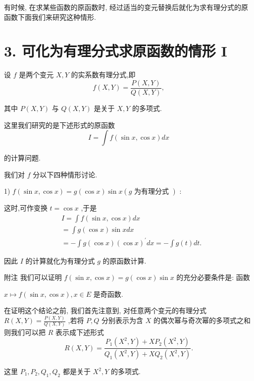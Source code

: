 有时候, 在求某些函数的原函数时, 经过适当的变元替换后就化为求有理分式的原函数下面我们来研究这种情形.

\section*{3. 可化为有理分式求原函数的情形 I}

设 $f$ 是两个变元 $X,Y$ 的实系数有理分式,即
$$f\left( {X,Y}\right)  = \frac{P\left( {X,Y}\right) }{Q\left( {X,Y}\right) },$$

其中 $P\left( {X,Y}\right)$ 与 $Q\left( {X,Y}\right)$ 是关于 $X,Y$ 的多项式.

这里我们研究的是下述形式的原函数
$$I = \int f\left( {\sin x,\cos x}\right) {dx}$$

的计算问题.

我们对 $f$ 分以下四种情形讨论.

1) $f\left( {\sin x,\cos x}\right)  = g\left( {\cos x}\right) \sin x\left( {g\text{ 为有理分式 }}\right)$ :

这时,可作变换 $t = \cos x$ ,于是
\begin{align*}
	&I = \int f\left( {\sin x,\cos x}\right) {dx}\\
	&= \int g\left( {\cos x}\right) \sin {xdx}\\
	&=  - \int g\left( {\cos x}\right) {\left( \cos x\right) }^{\prime }{dx} =  - \int g\left( t\right) {dt}.
\end{align*}

因此 $I$ 的计算就化为有理分式 $g$ 的原函数计算.

附注 我们可以证明 $f\left( {\sin x,\cos x}\right)  = g\left( {\cos x}\right) \sin x$ 的充分必要条件是: 函数

$x \mapsto  f\left( {\sin x,\cos x}\right) ,x \in  E$ 是奇函数.

在证明这个结论之前, 我们首先注意到, 对任意两个变元的有理分式 $R\left( {X,Y}\right)  = \frac{P\left( {X,Y}\right) }{Q\left( {X,Y}\right) }$ ,若将 $P,Q$ 分别表示为含 $X$ 的偶次幂与奇次幂的多项式之和则我们可以把 $R$ 表示成下述形式
$$R\left( {X,Y}\right)  = \frac{{P}_{1}\left( {{X}^{2},Y}\right)  + X{P}_{2}\left( {{X}^{2},Y}\right) }{{Q}_{1}\left( {{X}^{2},Y}\right)  + X{Q}_{2}\left( {{X}^{2},Y}\right) }.$$

这里 ${P}_{1},{P}_{2},{Q}_{1},{Q}_{2}$ 都是关于 ${X}^{2},Y$ 的多项式.


